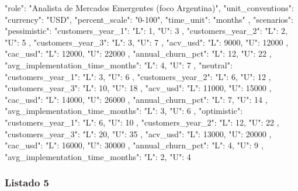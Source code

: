 \begin{APACode}
{
  "role": "Analista de Mercados Emergentes (foco Argentina)",
  "unit_conventions": {
    "currency": "USD",
    "percent_scale": "0-100",
    "time_unit": "months"
  },
  "scenarios": {
    "pessimistic": {
      "customers_year_1": {
        "L": 1,
        "U": 3
      },
      "customers_year_2": {
        "L": 2,
        "U": 5
      },
      "customers_year_3": {
        "L": 3,
        "U": 7
      },
      "acv_usd": {
        "L": 9000,
        "U": 12000
      },
      "cac_usd": {
        "L": 12000,
        "U": 22000
      },
      "annual_churn_pct": {
        "L": 12,
        "U": 22
      },
      "avg_implementation_time_months": {
        "L": 4,
        "U": 7
      }
    },
    "neutral": {
      "customers_year_1": {
        "L": 3,
        "U": 6
      },
      "customers_year_2": {
        "L": 6,
        "U": 12
      },
      "customers_year_3": {
        "L": 10,
        "U": 18
      },
      "acv_usd": {
        "L": 11000,
        "U": 15000
      },
      "cac_usd": {
        "L": 14000,
        "U": 26000
      },
      "annual_churn_pct": {
        "L": 7,
        "U": 14
      },
      "avg_implementation_time_months": {
        "L": 3,
        "U": 6
      }
    },
    "optimistic": {
      "customers_year_1": {
        "L": 6,
        "U": 10
      },
      "customers_year_2": {
        "L": 12,
        "U": 22
      },
      "customers_year_3": {
        "L": 20,
        "U": 35
      },
      "acv_usd": {
        "L": 13000,
        "U": 20000
      },
      "cac_usd": {
        "L": 16000,
        "U": 30000
      },
      "annual_churn_pct": {
        "L": 4,
        "U": 9
      },
      "avg_implementation_time_months": {
        "L": 2,
        "U": 4
      }
    }
  }
}
\end{APACode}

\subsubsection{Listado 5}
\label{anexo:code-6-3-2-5}

